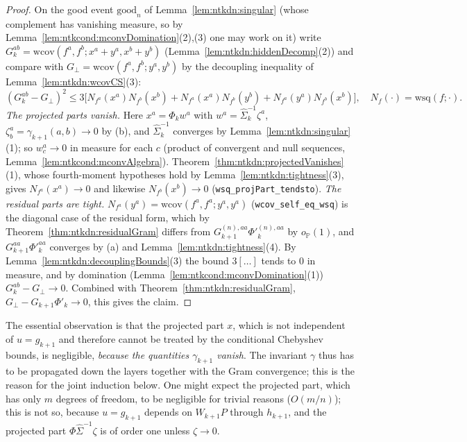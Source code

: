 \begin{proof}
  \leanok
On the good event $\mathrm{good}_n$ of Lemma~\ref{lem:ntkdn:singular} (whose complement has vanishing measure, so by Lemma~\ref{lem:ntkcond:mconvDomination}(2),(3) one may work on it) write $G_k^{ab}=\mathrm{wcov}(f^a,f^b;x^a+y^a,x^b+y^b)$ (Lemma~\ref{lem:ntkdn:hiddenDecomp}(2)) and compare with $G_\perp=\mathrm{wcov}(f^a,f^b;y^a,y^b)$ by the decoupling inequality of Lemma~\ref{lem:ntkdn:wcovCS}(3):
\[
  (G_k^{ab}-G_\perp)^2\le3\bigl[N_{f^a}(x^a)N_{f^b}(x^b)+N_{f^a}(x^a)N_{f^b}(y^b)+N_{f^a}(y^a)N_{f^b}(x^b)\bigr],\quad N_f(\cdot)=\mathrm{wsq}(f;\cdot).
\]
\emph{The projected parts vanish.} Here $x^a=\Phi_k w^a$ with $w^a=\hat\Sigma_k^{-1}\zeta^a$, $\zeta^a_b=\gamma_{k+1}(a,b)\to0$ by (b), and $\hat\Sigma_k^{-1}$ converges by Lemma~\ref{lem:ntkdn:singular}(1); so $w^a_c\to0$ in measure for each $c$ (product of convergent and null sequences, Lemma~\ref{lem:ntkcond:mconvAlgebra}). Theorem~\ref{thm:ntkdn:projectedVanishes}(1), whose fourth-moment hypotheses hold by Lemma~\ref{lem:ntkdn:tightness}(3), gives $N_{f^a}(x^a)\to0$ and likewise $N_{f^b}(x^b)\to0$ (\texttt{wsq\_projPart\_tendsto}).
\emph{The residual parts are tight.} $N_{f^a}(y^a)=\mathrm{wcov}(f^a,f^a;y^a,y^a)$ (\texttt{wcov\_self\_eq\_wsq}) is the diagonal case of the residual form, which by Theorem~\ref{thm:ntkdn:residualGram} differs from $G_{k+1}^{(n),aa}\Phi'^{(n),aa}_k$ by $o_{\mathbb P}(1)$, and $G_{k+1}^{aa}\Phi'^{aa}_k$ converges by (a) and Lemma~\ref{lem:ntkdn:tightness}(4).
By Lemma~\ref{lem:ntkdn:decouplingBounds}(3) the bound $3[\ldots]$ tends to $0$ in measure, and by domination (Lemma~\ref{lem:ntkcond:mconvDomination}(1)) $G_k^{ab}-G_\perp\to0$. Combined with Theorem~\ref{thm:ntkdn:residualGram}, $G_\perp-G_{k+1}\Phi'_k\to0$, this gives the claim.
\end{proof}

The essential observation is that the projected part $x$, which is not independent of $u=g_{k+1}$ and therefore cannot be treated by the conditional Chebyshev bounds, is negligible, \emph{because the quantities $\gamma_{k+1}$ vanish}. The invariant $\gamma$ thus has to be propagated down the layers together with the Gram convergence; this is the reason for the joint induction below. One might expect the projected part, which has only $m$ degrees of freedom, to be negligible for trivial reasons ($O(m/n)$); this is not so, because $u=g_{k+1}$ depends on $W_{k+1}P$ through $h_{k+1}$, and the projected part $\Phi\hat\Sigma^{-1}\zeta$ is of order one unless $\zeta\to0$.

